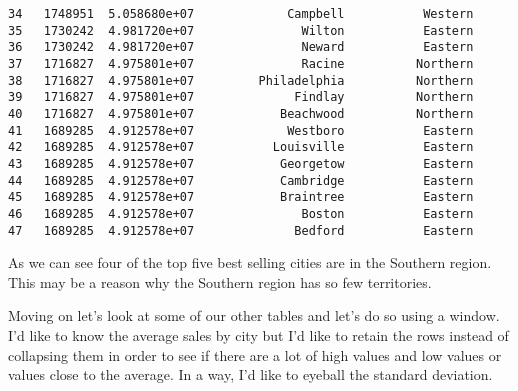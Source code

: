 \documentclass[11pt]{article}
\begin{document}
\begin{tcolorbox}[breakable, size=fbox, boxrule=.5pt, pad at break*=1mm, opacityfill=0]
\begin{Verbatim}[commandchars=\\\{\}]
34   1748951  5.058680e+07             Campbell           Western
35   1730242  4.981720e+07               Wilton           Eastern
36   1730242  4.981720e+07               Neward           Eastern
37   1716827  4.975801e+07               Racine          Northern
38   1716827  4.975801e+07         Philadelphia          Northern
39   1716827  4.975801e+07              Findlay          Northern
40   1716827  4.975801e+07            Beachwood          Northern
41   1689285  4.912578e+07             Westboro           Eastern
42   1689285  4.912578e+07           Louisville           Eastern
43   1689285  4.912578e+07            Georgetow           Eastern
44   1689285  4.912578e+07            Cambridge           Eastern
45   1689285  4.912578e+07            Braintree           Eastern
46   1689285  4.912578e+07               Boston           Eastern
47   1689285  4.912578e+07              Bedford           Eastern
\end{Verbatim}
\end{tcolorbox}
        
    As we can see four of the top five best selling cities are in the
Southern region. This may be a reason why the Southern region has so few
territories.

Moving on let's look at some of our other tables and let's do so using a
window. I'd like to know the average sales by city but I'd like to
retain the rows instead of collapsing them in order to see if there are
a lot of high values and low values or values close to the average. In a
way, I'd like to eyeball the standard deviation.
\end{document}
